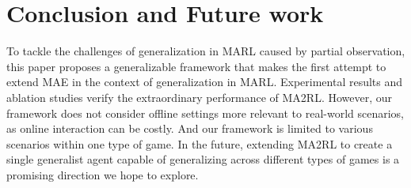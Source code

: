 \section{Conclusion and Future work}
\label{Conclusions}
To tackle the challenges of generalization in MARL caused by partial observation, this paper proposes a generalizable framework that makes the first attempt to extend MAE in the context of generalization in MARL. Experimental results and ablation studies verify the extraordinary performance of MA2RL. However, our framework does not consider offline settings more relevant to real-world scenarios, as online interaction can be costly. And our framework is limited to various scenarios within one type of game. In the future, extending MA2RL to create a single generalist agent capable of generalizing across different types of games is a promising direction we hope to explore.
